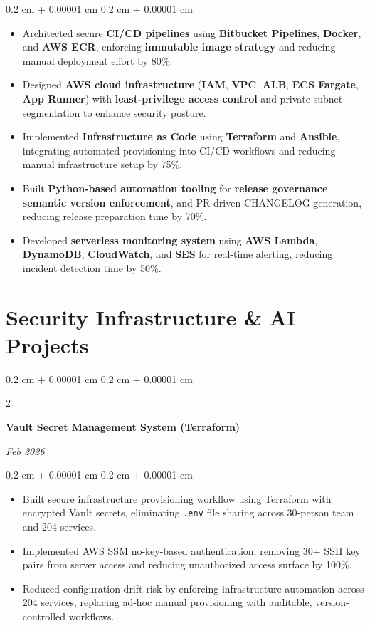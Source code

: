 \documentclass[10pt, letterpaper]{article}
\newenvironment{highlights}{
    \begin{itemize}[
        topsep=0.10 cm,
        parsep=0.10 cm,
        partopsep=0pt,
        itemsep=0pt,
        leftmargin=0.4 cm + 10pt
    ]
}{
    \end{itemize}
} %
\newenvironment{onecolentry}{
    \begin{adjustwidth}{
        0.2 cm + 0.00001 cm
    }{
        0.2 cm + 0.00001 cm
    }
}{
    \end{adjustwidth}
} %
\newenvironment{twocolentry}[2][]{
    \onecolentry
    \def\secondColumn{#2}
    \setcolumnwidth{\fill, 4.5 cm}
    \begin{paracol}{2}
}{
    \switchcolumn \raggedleft \secondColumn
    \end{paracol}
    \endonecolentry
} %
\begin{document}
\begin{onecolentry}
\begin{highlights}

\item Architected secure \textbf{CI/CD pipelines} using \textbf{Bitbucket Pipelines}, \textbf{Docker}, and \textbf{AWS ECR}, enforcing \textbf{immutable image strategy} and reducing manual deployment effort by 80\%.

\item Designed \textbf{AWS cloud infrastructure} (\textbf{IAM}, \textbf{VPC}, \textbf{ALB}, \textbf{ECS Fargate}, \textbf{App Runner}) with \textbf{least-privilege access control} and private subnet segmentation to enhance security posture.

\item Implemented \textbf{Infrastructure as Code} using \textbf{Terraform} and \textbf{Ansible}, integrating automated provisioning into CI/CD workflows and reducing manual infrastructure setup by 75\%.

\item Built \textbf{Python-based automation tooling} for \textbf{release governance}, \textbf{semantic version enforcement}, and PR-driven CHANGELOG generation, reducing release preparation time by 70\%.

\item Developed \textbf{serverless monitoring system} using \textbf{AWS Lambda}, \textbf{DynamoDB}, \textbf{CloudWatch}, and \textbf{SES} for real-time alerting, reducing incident detection time by 50\%.

\end{highlights}
\end{onecolentry}
    
\section{Security Infrastructure \& AI Projects}

\begin{twocolentry}{\textit{Feb 2026}}
\textbf{Vault Secret Management System (Terraform)}
\end{twocolentry}

\begin{onecolentry}
\begin{highlights}
    \item Built secure infrastructure provisioning workflow using Terraform with encrypted Vault secrets, eliminating \texttt{.env} file sharing across 30-person team and 204 services.
    \item Implemented AWS SSM no-key-based authentication, removing 30+ SSH key pairs from server access and reducing unauthorized access surface by 100\%.
    \item Reduced configuration drift risk by enforcing infrastructure automation across 204 services, replacing ad-hoc manual provisioning with auditable, version-controlled workflows.
\end{highlights}
\end{onecolentry}
\end{document}
